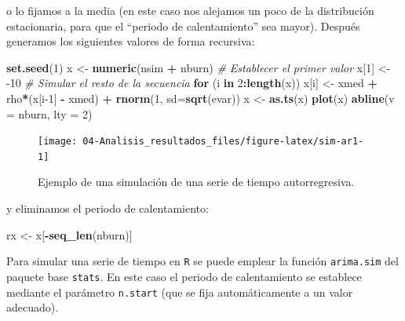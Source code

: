 \documentclass[
]{book}
\newenvironment{Shaded}{\begin{snugshade}}{\end{snugshade}}
\newcommand{\CommentTok}[1]{\textcolor[rgb]{0.56,0.35,0.01}{\textit{#1}}}
\newcommand{\ControlFlowTok}[1]{\textcolor[rgb]{0.13,0.29,0.53}{\textbf{#1}}}
\newcommand{\DataTypeTok}[1]{\textcolor[rgb]{0.13,0.29,0.53}{#1}}
\newcommand{\DecValTok}[1]{\textcolor[rgb]{0.00,0.00,0.81}{#1}}
\newcommand{\KeywordTok}[1]{\textcolor[rgb]{0.13,0.29,0.53}{\textbf{#1}}}
\newcommand{\NormalTok}[1]{#1}
\newcommand{\OperatorTok}[1]{\textcolor[rgb]{0.81,0.36,0.00}{\textbf{#1}}}
\newcommand{\StringTok}[1]{\textcolor[rgb]{0.31,0.60,0.02}{#1}}
\theoremstyle{break}
\theoremstyle{definition}
\theoremstyle{definition}
\theoremstyle{definition}
\theoremstyle{remark}
\begin{document}
o lo fijamos a la media (en este caso nos alejamos un poco de la distribución estacionaria, para que el ``periodo de calentamiento'' sea mayor).
Después generamos los siguientes valores de forma recursiva:

\begin{Shaded}
\begin{Highlighting}[]
\KeywordTok{set.seed}\NormalTok{(}\DecValTok{1}\NormalTok{)}
\NormalTok{x <-}\StringTok{ }\KeywordTok{numeric}\NormalTok{(nsim }\OperatorTok{+}\StringTok{ }\NormalTok{nburn)}
\CommentTok{# Establecer el primer valor }
\NormalTok{x[}\DecValTok{1}\NormalTok{] <-}\StringTok{ }\DecValTok{-10}
\CommentTok{# Simular el resto de la secuencia}
\ControlFlowTok{for}\NormalTok{ (i }\ControlFlowTok{in} \DecValTok{2}\OperatorTok{:}\KeywordTok{length}\NormalTok{(x))}
\NormalTok{  x[i] <-}\StringTok{ }\NormalTok{xmed }\OperatorTok{+}\StringTok{ }\NormalTok{rho}\OperatorTok{*}\NormalTok{(x[i}\DecValTok{-1}\NormalTok{] }\OperatorTok{-}\StringTok{ }\NormalTok{xmed) }\OperatorTok{+}\StringTok{ }\KeywordTok{rnorm}\NormalTok{(}\DecValTok{1}\NormalTok{, }\DataTypeTok{sd=}\KeywordTok{sqrt}\NormalTok{(evar))}
\NormalTok{x <-}\StringTok{ }\KeywordTok{as.ts}\NormalTok{(x)}
\KeywordTok{plot}\NormalTok{(x)}
\KeywordTok{abline}\NormalTok{(}\DataTypeTok{v =}\NormalTok{ nburn, }\DataTypeTok{lty =} \DecValTok{2}\NormalTok{)}
\end{Highlighting}
\end{Shaded}

\begin{figure}[!htb]

{\centering \texttt{[image: 04-Analisis\_resultados\_files/figure-latex/sim-ar1-1]} 

}

\caption{Ejemplo de una simulación de una serie de tiempo autorregresiva.}\label{fig:sim-ar1}
\end{figure}

y eliminamos el periodo de calentamiento:

\begin{Shaded}
\begin{Highlighting}[]
\NormalTok{rx <-}\StringTok{ }\NormalTok{x[}\OperatorTok{-}\KeywordTok{seq_len}\NormalTok{(nburn)]}
\end{Highlighting}
\end{Shaded}

Para simular una serie de tiempo en \texttt{R}
se puede emplear la función \texttt{arima.sim} del paquete base \texttt{stats}.
En este caso el periodo de calentamiento se establece mediante el
parámetro \texttt{n.start} (que se fija automáticamente a un valor adecuado).
\end{document}
